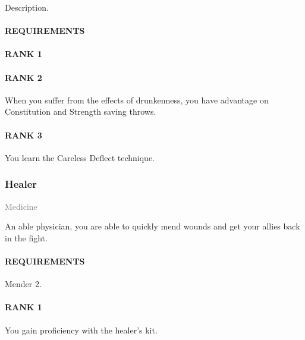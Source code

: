 \normalsize
Description.
\paragraph{REQUIREMENTS}
\paragraph{RANK 1}
\paragraph{RANK 2} When you suffer from the effects of drunkenness, you have advantage on Constitution and Strength saving throws.
\paragraph{RANK 3} You learn the Careless Deflect technique.


\subsubsection{Healer} \label{feat::healer}
\small{\textcolor{gray}{Medicine}}

\normalsize
An able physician, you are able to quickly mend wounds and get your allies back in the fight.
\paragraph{REQUIREMENTS} Mender 2.
\paragraph{RANK 1} You gain proficiency with the healer's kit.
